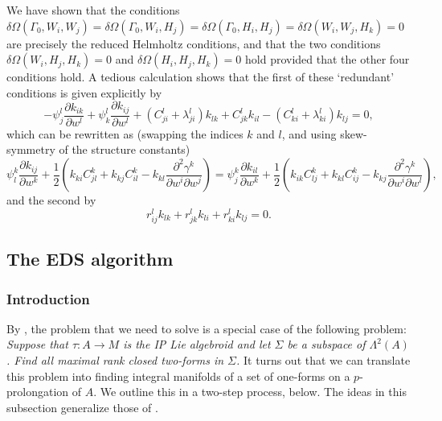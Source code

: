 \documentclass[11pt]{article}
\theoremstyle{plain}
\theoremstyle{definition}
\begin{document}
We have shown that the conditions $\delta\Omega(\Gamma_0,W_i,W_j)=\delta \Omega(\Gamma_0,W_i,H_j)=\delta \Omega(\Gamma_0,H_i,H_j)=\delta \Omega(W_i,W_j,H_k)=0$ are precisely the reduced Helmholtz conditions, and that the two conditions $\delta \Omega(W_i,H_j,H_k)=0$ and $\delta\Omega(H_i,H_j,H_k)=0$ hold provided that the other four conditions hold. A tedious calculation shows that the first of these `redundant' conditions is given explicitly by
\begin{equation*}
    -\psi_j^l \frac{\partial k_{ik}}{\partial w^l}+\psi_k^l \frac{\partial k_{ij}}{\partial w^l}+(C_{ji}^l+\lambda_{ji}^l)k_{lk}+C_{jk}^lk_{il}-(C_{ki}^l+\lambda_{ki}^l)k_{lj}=0,
\end{equation*}
which can be rewritten as (swapping the indices $k$ and $l$, and using skew-symmetry of the structure constants)
\begin{equation}\label{eqn:redundanthelmholtz1}
    \psi_l^k \frac{\partial k_{ij}}{\partial w^k}+\frac{1}{2}\left(k_{ki}C_{jl}^k+k_{kj}C_{il}^k-k_{kl}\frac{\partial^2 \gamma^k}{\partial w^i \partial w^j}\right)=\psi_j^k \frac{\partial k_{il}}{\partial w^k}+\frac{1}{2}\left(k_{ik} C_{lj}^k+k_{kl} C_{ij}^k-k_{kj}\frac{\partial^2 \gamma^k}{\partial w^i \partial w^l}\right),
\end{equation}
and the second by
\begin{equation}\label{eqn:redundanthelmholtz2}
    r_{ij}^l k_{lk}+r_{jk}^l k_{li}+r_{ki}^l k_{lj}=0.
\end{equation}

\subsection{The EDS algorithm}

\subsubsection{Introduction}\label{introsubsec}

By , the problem that we need to solve is a special case of the following problem: \emph{Suppose that $\tau\colon A\to M$ is the  IP Lie algebroid and let $\Sigma$ be a subspace of $\Lambda^2(A)$. Find all maximal rank closed two-forms in $\Sigma$.} It turns out that we can translate this problem into finding integral manifolds of a set of one-forms on a $p$-prolongation of $A$. We outline this in a two-step process, below. The ideas in this subsection generalize those of \cite{aldridge2003invprob,anderson1992invprob,do2016invprob}.
\end{document}
